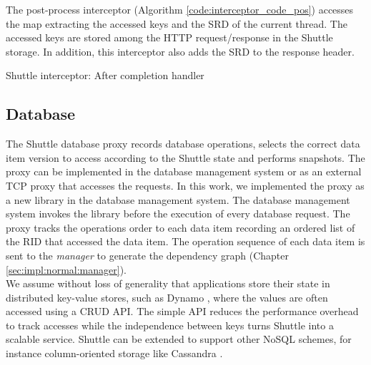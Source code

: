 The post-process interceptor (Algorithm \ref{code:interceptor_code_pos}) accesses the map extracting the accessed keys and the \ac{SRD} of the current thread. The accessed keys are stored among the \ac{HTTP} request/response in the Shuttle storage. In addition, this interceptor also adds the \ac{SRD} to the response header.

\begin{algorithm}
\DontPrintSemicolon{}

	\BlankLine
	 \caption{Shuttle interceptor: After completion handler}
	\label{code:interceptor_code_pos}
\end{algorithm}



\subsection{Database}\label{sec:impl:normal:database}
The Shuttle database proxy records database operations, selects the correct data item version to access according to the Shuttle state and performs snapshots. The proxy can be implemented in the database management system or as an external \ac{TCP} proxy that accesses the requests. In this work, we implemented the proxy as a new library in the database management system. The database management system invokes the library before the execution of every database request. The proxy tracks the operations order to each data item recording an ordered list of the \ac{RID} that accessed the data item. The operation sequence of each data item is sent to the \textit{manager} to generate the dependency graph (Chapter \ref{sec:impl:normal:manager}). \\


We assume without loss of generality that applications store their state in distributed key-value stores, such as Dynamo \cite{Decandia2007}, where the values are often accessed using a \acf{CRUD} API. The simple \ac{API} reduces the performance overhead to track accesses while the independence between keys turns Shuttle into a scalable service. Shuttle can be extended to support other \acs{NoSQL} schemes, for instance column-oriented storage like Cassandra \cite{Lakshman2010a}.\\

